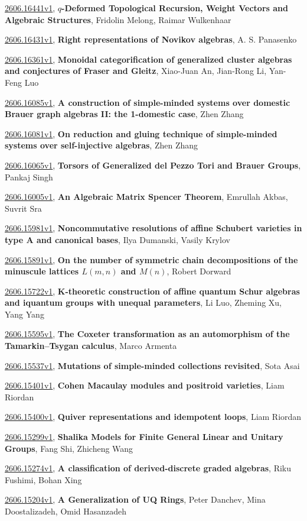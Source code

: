 \documentclass[9pt, a4paper]{article}
\theoremstyle{plain}
\theoremstyle{definition}
\theoremstyle{remark}
\newcommand{\arxiv}[3]{\href{https://arxiv.org/abs/#1}{#1}, \textbf{\textcolor{arxivblue}{#2}}, #3}
\begin{document}
\arxiv{2606.16441v1}{$q$-Deformed Topological Recursion, Weight Vectors and Algebraic Structures}{Fridolin Melong, Raimar Wulkenhaar}

\arxiv{2606.16431v1}{Right representations of Novikov algebras}{A. S. Panasenko}

\arxiv{2606.16361v1}{Monoidal categorification of generalized cluster algebras and conjectures of Fraser and Gleitz}{Xiao-Juan An, Jian-Rong Li, Yan-Feng Luo}

\arxiv{2606.16085v1}{A construction of simple-minded systems over domestic Brauer graph algebras II: the 1-domestic case}{Zhen Zhang}

\arxiv{2606.16081v1}{On reduction and gluing technique of simple-minded systems over self-injective algebras}{Zhen Zhang}

\arxiv{2606.16065v1}{Torsors of Generalized del Pezzo Tori and Brauer Groups}{Pankaj Singh}

\arxiv{2606.16005v1}{An Algebraic Matrix Spencer Theorem}{Emrullah Akbas, Suvrit Sra}

\arxiv{2606.15981v1}{Noncommutative resolutions of affine Schubert varieties in type A and canonical bases}{Ilya Dumanski, Vasily Krylov}

\arxiv{2606.15891v1}{On the number of symmetric chain decompositions of the minuscule lattices $L(m,n)$ and $M(n)$}{Robert Dorward}

\arxiv{2606.15722v1}{K-theoretic construction of affine quantum Schur algebras and iquantum groups with unequal parameters}{Li Luo, Zheming Xu, Yang Yang}

\arxiv{2606.15595v1}{The Coxeter transformation as an automorphism of the Tamarkin--Tsygan calculus}{Marco Armenta}

\arxiv{2606.15537v1}{Mutations of simple-minded collections revisited}{Sota Asai}

\arxiv{2606.15401v1}{Cohen Macaulay modules and positroid varieties}{Liam Riordan}

\arxiv{2606.15400v1}{Quiver representations and idempotent loops}{Liam Riordan}

\arxiv{2606.15299v1}{Shalika Models for Finite General Linear and Unitary Groups}{Fang Shi, Zhicheng Wang}

\arxiv{2606.15274v1}{A classification of derived-discrete graded algebras}{Riku Fushimi, Bohan Xing}

\arxiv{2606.15204v1}{A Generalization of UQ Rings}{Peter Danchev, Mina Doostalizadeh, Omid Hasanzadeh}
\end{document}
